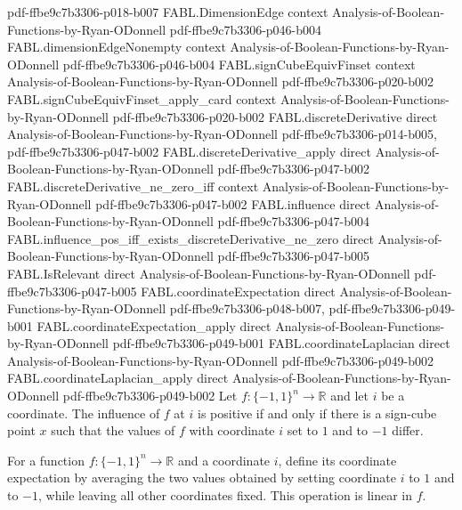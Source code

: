 \begin{theorem}
  {pdf-ffbe9c7b3306-p018-b007}
\proofstep
  {FABL.DimensionEdge}
  {context}
  {Analysis-of-Boolean-Functions-by-Ryan-ODonnell}
  {pdf-ffbe9c7b3306-p046-b004}
\proofstep
  {FABL.dimensionEdgeNonempty}
  {context}
  {Analysis-of-Boolean-Functions-by-Ryan-ODonnell}
  {pdf-ffbe9c7b3306-p046-b004}
\proofstep
  {FABL.signCubeEquivFinset}
  {context}
  {Analysis-of-Boolean-Functions-by-Ryan-ODonnell}
  {pdf-ffbe9c7b3306-p020-b002}
\proofstep
  {FABL.signCubeEquivFinset_apply_card}
  {context}
  {Analysis-of-Boolean-Functions-by-Ryan-ODonnell}
  {pdf-ffbe9c7b3306-p020-b002}
\proofstep
  {FABL.discreteDerivative}
  {direct}
  {Analysis-of-Boolean-Functions-by-Ryan-ODonnell}
  {pdf-ffbe9c7b3306-p014-b005,
    pdf-ffbe9c7b3306-p047-b002}
\proofstep
  {FABL.discreteDerivative_apply}
  {direct}
  {Analysis-of-Boolean-Functions-by-Ryan-ODonnell}
  {pdf-ffbe9c7b3306-p047-b002}
\proofstep
  {FABL.discreteDerivative_ne_zero_iff}
  {context}
  {Analysis-of-Boolean-Functions-by-Ryan-ODonnell}
  {pdf-ffbe9c7b3306-p047-b002}
\proofstep
  {FABL.influence}
  {direct}
  {Analysis-of-Boolean-Functions-by-Ryan-ODonnell}
  {pdf-ffbe9c7b3306-p047-b004}
\proofstep
  {FABL.influence_pos_iff_exists_discreteDerivative_ne_zero}
  {direct}
  {Analysis-of-Boolean-Functions-by-Ryan-ODonnell}
  {pdf-ffbe9c7b3306-p047-b005}
\proofstep
  {FABL.IsRelevant}
  {direct}
  {Analysis-of-Boolean-Functions-by-Ryan-ODonnell}
  {pdf-ffbe9c7b3306-p047-b005}
\proofstep
  {FABL.coordinateExpectation}
  {direct}
  {Analysis-of-Boolean-Functions-by-Ryan-ODonnell}
  {pdf-ffbe9c7b3306-p048-b007,
    pdf-ffbe9c7b3306-p049-b001}
\proofstep
  {FABL.coordinateExpectation_apply}
  {direct}
  {Analysis-of-Boolean-Functions-by-Ryan-ODonnell}
  {pdf-ffbe9c7b3306-p049-b001}
\proofstep
  {FABL.coordinateLaplacian}
  {direct}
  {Analysis-of-Boolean-Functions-by-Ryan-ODonnell}
  {pdf-ffbe9c7b3306-p049-b002}
\proofstep
  {FABL.coordinateLaplacian_apply}
  {direct}
  {Analysis-of-Boolean-Functions-by-Ryan-ODonnell}
  {pdf-ffbe9c7b3306-p049-b002}
Let $f:\{−1,1\}^n\to\mathbb R$ and let $i$ be a coordinate. The influence of $f$ at
$i$ is positive if and only if there is a sign-cube point $x$ such that the values of
$f$ with coordinate $i$ set to $1$ and to $-1$ differ.
\end{theorem}

\begin{definition}
\label{FABL.coordinateExpectation}
\leanok
{}
For a function $f:\{-1,1\}^n\to\mathbb R$ and a coordinate $i$, define its coordinate
expectation by averaging the two values obtained by setting coordinate $i$ to $1$ and to
$-1$, while leaving all other coordinates fixed. This operation is linear in $f$.
\end{definition}


